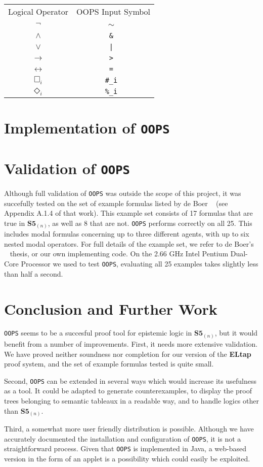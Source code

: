 \documentclass[11pt,a4paper]{article}
\begin{document}
\begin{tabular}{cc}
Logical Operator & OOPS Input Symbol \\
$\neg$ & \tt{$\sim$} \\ 
$\wedge$ & \tt{\&} \\
$\vee$ & \tt{|} \\
$\rightarrow$ & \tt{>} \\
$\leftrightarrow$ & \tt{=} \\
$\Box_i$ & \tt{\#\_i}  \\
$\Diamond_i$ & \tt{\%\_i}  \\
\end{tabular}

\section{Implementation of {\tt OOPS}}
\label{imp}


\section{Validation of {\tt OOPS}}

Although full validation of {\tt OOPS} was outside the scope of this project, it was succefully tested on the set of example formulas listed by de Boer ~\cite{these} (see Appendix A.1.4 of that work). This example set  consists of 17 formulas that are true in $\textbf{S5}_{(n)}$, as well as 8 that are not. {\tt OOPS} performs correctly on all 25. This includes modal formulas concerning up to three different agents, with up to six nested modal operators. For full details of the example set, we refer to de Boer's ~\cite{these} thesis, or our own implementing code. On the 2.66 GHz Intel Pentium Dual-Core Processor we used to test {\tt OOPS}, evaluating all 25 examples takes slightly less than half a second.

\label{val}

\section{Conclusion and Further Work}
\label{more}

{\tt OOPS} seems to be a succesful proof tool for epistemic logic in  $\textbf{S5}_{(n)}$, but it would benefit from a number of improvements. First, it needs more extensive validation. We have proved neither soundness nor completion for our version of the {\bf ELtap}~\cite{these} proof system, and the set of example formulas tested is quite small.
\par Second, {\tt OOPS} can be extended in several ways which would increase its usefulness as a tool. It could be adapted to generate counterexamples, to display the proof trees belonging to semantic tableaux in a readable way, and to handle logics other than $\textbf{S5}_{(n)}$.
\par Third, a somewhat more user friendly distribution is possible. Although we have accurately documented the installation and configuration of {\tt OOPS}, it is not a straightforward process. Given that {\tt OOPS} is implemented in Java, a web-based version in the form of an applet is a possibility which could easily be exploited.
\end{document}
